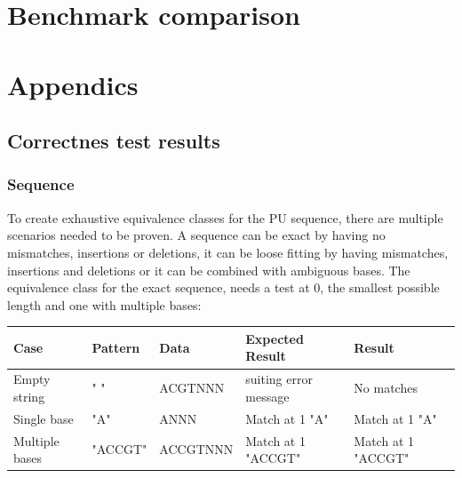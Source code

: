 \documentclass[12pt]{article}
\newcommand{\pu}{PU }
\begin{document}
\section{Benchmark comparison}

\newpage
\printbibliography









\section{Appendics}


\subsection{Correctnes test results}



\subsubsection{Sequence}
To create exhaustive equivalence classes for the \pu sequence, there are multiple scenarios needed to be proven.
A sequence can be exact by having no mismatches, insertions or deletions, it can be loose fitting by having 
mismatches, insertions and deletions or it can be combined with ambiguous bases.
The equivalence class for the exact sequence, needs a test at 0, the smallest possible length and one with multiple bases:
\begin{table}[H]
\begin{tabular}{p{4cm}|p{3.6cm}|p{2.5cm}|p{2.2cm}|p{2.2cm}}
Case 			& Pattern & Data & Expected Result & Result \\ \hline
\rowcolor{lightred}
Empty string		& " " & ACGTNNN & suiting error message & No matches \\ \hline
\rowcolor{lightgreen}
Single base 		& "A" & ANNN & Match at 1 "A" & Match at 1 "A"\\ \hline
\rowcolor{lightgreen}
Multiple bases	& "ACCGT" & ACCGTNNN & Match at 1 "ACCGT" & Match at 1 "ACCGT" \\ \hline
\end{tabular}
\end{table}
\end{document}
